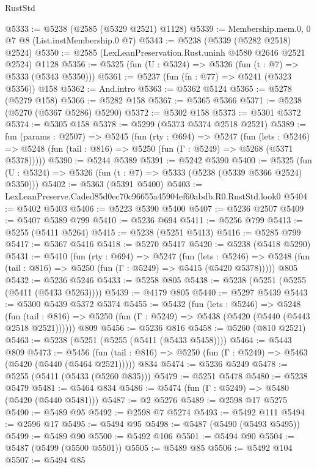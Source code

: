 \begin{lexlean}{RustStd}
\begin{coremodule}
@5333 := @5238 (@2585 (@5329 @2521) @1128)
@5339 := Membership.mem.{0, 0} @7 @8 (List.instMembership.{0} @7)
@5343 := @5238 (@5339 (@5282 @2518) @2524)
@5350 := @2585 (LexLeanPreservation.Rust.uninh @4580 @2646 @2521 @2524) @1128
@5356 := @5325 (fun (U : @5324) => @5326 (fun (t : @7) => @5333 (@5343 @5350)))
@5361 := @5237 (fun (fn : @77) => @5241 (@5323 @5356)) @158
@5362 := And.intro
@5363 := @5362 @5124
@5365 := @5278 (@5279 @158)
@5366 := @5282 @158
@5367 := @5365 @5366
@5371 := @5238 (@5270 (@5367 @5286) @5290)
@5372 := @5302 @158
@5373 := @5301 @5372
@5374 := @5305 @158
@5378 := @5299 (@5373 @5374 @2518 @2521)
@5389 := fun (params : @2507) =>
  @5245
    (fun (rty : @694) =>
    @5247
      (fun (lets : @5246) =>
      @5248 (fun (tail : @816) => @5250 (fun (Γ : @5249) => @5268 (@5371 @5378)))))
@5390 := @5244 @5389
@5391 := @5242 @5390
@5400 := @5325 (fun (U : @5324) => @5326 (fun (t : @7) => @5333 (@5238 (@5339 @5366 @2524) @5350)))
@5402 := @5363 (@5391 @5400)
@5403 := LexLeanPreserve.Caded85d0ec70c96655a45904ef60abdb.R0.RustStd.look0
@5404 := @5402 @5403
@5406 := @5223 @5390 @5400
@5407 := @5236 @2507
@5409 := @5407 @5389 @799
@5410 := @5236 @694
@5411 := @5256 @799
@5413 := @5255 (@5411 @5264)
@5415 := @5238 (@5251 @5413)
@5416 := @5285 @799
@5417 := @5367 @5416
@5418 := @5270 @5417
@5420 := @5238 (@5418 @5290)
@5431 := @5410
    (fun (rty : @694) =>
    @5247
      (fun (lets : @5246) =>
      @5248 (fun (tail : @816) => @5250 (fun (Γ : @5249) => @5415 (@5420 @5378)))))
    @805
@5432 := @5236 @5246
@5433 := @5258 @805
@5438 := @5238 (@5251 (@5255 (@5411 (@5433 @5263))))
@5439 := @4179 @805
@5440 := @5297 @5439
@5443 := @5300 @5439 @5372 @5374
@5455 := @5432
    (fun (lets : @5246) =>
    @5248
      (fun (tail : @816) => @5250 (fun (Γ : @5249) => @5438 (@5420 (@5440 (@5443 @2518 @2521))))))
    @809
@5456 := @5236 @816
@5458 := @5260 (@810 @2521)
@5463 := @5238 (@5251 (@5255 (@5411 (@5433 @5458))))
@5464 := @5443 @809
@5473 := @5456
    (fun (tail : @816) => @5250 (fun (Γ : @5249) => @5463 (@5420 (@5440 (@5464 @2521)))))
    @834
@5474 := @5236 @5249
@5478 := @5255 (@5411 (@5433 (@5260 @835)))
@5479 := @5251 @5478
@5480 := @5238 @5479
@5481 := @5464 @834
@5486 := @5474 (fun (Γ : @5249) => @5480 (@5420 (@5440 @5481)))
@5487 := @2 @5276
@5489 := @2598 @17 @5275
@5490 := @5489 @95
@5492 := @2598 @7 @5274
@5493 := @5492 @111
@5494 := @2596 @17
@5495 := @5494 @95
@5498 := @5487 (@5490 (@5493 @5495))
@5499 := @5489 @90
@5500 := @5492 @106
@5501 := @5494 @90
@5504 := @5487 (@5499 (@5500 @5501))
@5505 := @5489 @85
@5506 := @5492 @104
@5507 := @5494 @85

\end{coremodule}
\end{lexlean}
